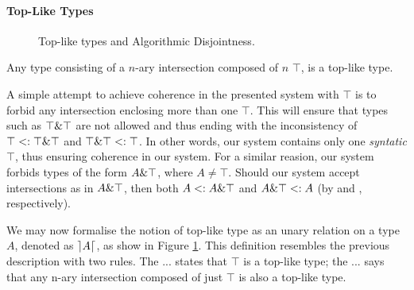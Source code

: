 \paragraph{Top-Like Types}
\begin{figure}[h]


  \caption{Top-like types and Algorithmic Disjointness.}
  \label{fig:tltypesdis}
\end{figure}

\begin{definition}
  Any type consisting of a $n$-ary intersection composed of $n$ $\top$, is a top-like type. 
\end{definition}


A simple attempt to achieve coherence in the presented system with $\top$ is to forbid any intersection enclosing 
more than one $\top$.
This will ensure that types such as $\top \& \top$ are not allowed and thus ending with the inconsistency of
$\top <: \top \& \top$ and $\top \& \top <: \top$.
In other words, our system contains only one \emph{syntatic} $\top$, thus ensuring coherence in our system.
For a similar reasion, our system forbids types of the form $A \& \top$, where $A \neq \top$.  
Should our system accept intersections as in $A \& \top$, then both $A <: A \& \top$ and 
$A \& \top <: A$ (by  and , respectively).

We may now formalise the notion of top-like type as an unary relation on a type $A$, denoted as $\rceil A \lceil$, as show in 
Figure \ref{fig:tltypesdis}.
This definition resembles the previous description with two rules.
The ... states that $\top$ is a top-like type; the ... says that any n-ary intersection composed of just $\top$ is also a
top-like type.

